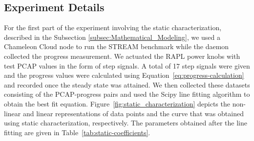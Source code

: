 \subsection{Experiment Details}\label{sec:exp_details}
For the first part of the experiment involving the static characterization, described in the Subsection \ref{subsec:Mathematical_Modeling}, we used a Chameleon Cloud node to run the STREAM benchmark while the daemon collected the progress measurement. We actuated the RAPL power knobs with test PCAP values in the form of step signals. A total of 17 step signals were given and the progress values were calculated using Equation~\ref{eq:progress-calculation} and recorded once the steady state was attained. We then collected these datasets consisting of the PCAP-progress pairs and used the Scipy line fitting algorithm to obtain the best fit equation. Figure~\ref{fig:static_characterization} depicts the non-linear and linear representations of data points and the curve that was obtained using static characterization, respectively. The parameters obtained after the line fitting are given in Table~\ref{tab:static-coefficients}.



